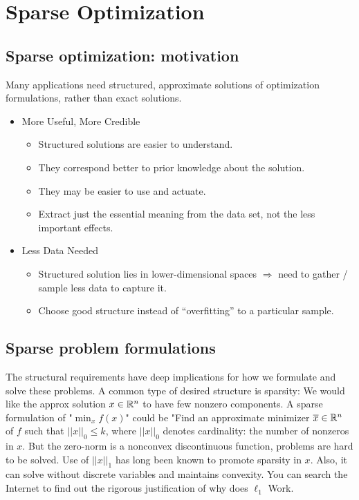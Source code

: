\chapter{Sparse Optimization}

\section{Sparse optimization: motivation}

Many applications need structured, approximate solutions of optimization
formulations, rather than exact solutions.
\begin{itemize}
    \item More Useful, More Credible
    \begin{itemize}
        \item Structured solutions are easier to understand.
        \item They correspond better to prior knowledge about the solution.
        \item They may be easier to use and actuate.
        \item Extract just the essential meaning from the data set, not the less
        important effects.
    \end{itemize}
    \item Less Data Needed
    \begin{itemize}
        \item Structured solution lies in lower-dimensional spaces $\Rightarrow$ need to gather /
        sample less data to capture it.
        \item Choose good structure instead of “overfitting” to a particular sample.
    \end{itemize}
\end{itemize}


\section{Sparse problem formulations}
The structural requirements have deep implications for how we formulate
and solve these problems. A common type of desired structure is sparsity: 
We would like the approx
solution $x \in \mathbb{R}^n$ to have few nonzero components. 
A sparse formulation of "$\min_{x} f (x)$" could be
"Find an approximate minimizer $\overline{x} \in \mathbb{R}^n$ 
of $f$ such that $||x||_0 \leqslant k$,
where $||x||_0$ denotes cardinality: the number of nonzeros in $x$.
But the zero-norm is a nonconvex discontinuous function, 
problems are hard to be solved. Use of $||x||_1$ has long been known to promote sparsity in $x$. 
Also, it can solve without discrete variables and maintains convexity. 
You can search the Internet to find out the rigorous justification of why does $\ell_1$ Work.

